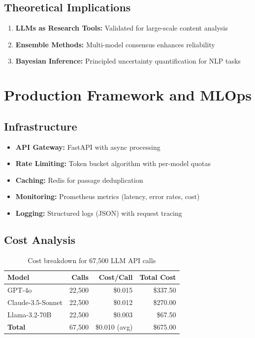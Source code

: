 \documentclass[11pt,a4paper]{article}
\begin{document}
\subsection{Theoretical Implications}

\begin{enumerate}
    \item \textbf{LLMs as Research Tools:} Validated for large-scale content analysis
    \item \textbf{Ensemble Methods:} Multi-model consensus enhances reliability
    \item \textbf{Bayesian Inference:} Principled uncertainty quantification for NLP tasks
\end{enumerate}

\section{Production Framework and MLOps}

\subsection{Infrastructure}

\begin{itemize}
    \item \textbf{API Gateway:} FastAPI with async processing
    \item \textbf{Rate Limiting:} Token bucket algorithm with per-model quotas
    \item \textbf{Caching:} Redis for passage deduplication
    \item \textbf{Monitoring:} Prometheus metrics (latency, error rates, cost)
    \item \textbf{Logging:} Structured logs (JSON) with request tracing
\end{itemize}

\subsection{Cost Analysis}

\begin{table}[H]
\centering
\caption{Cost breakdown for 67,500 LLM API calls}
\begin{tabular}{lrrr}
\toprule
\textbf{Model} & \textbf{Calls} & \textbf{Cost/Call} & \textbf{Total Cost} \\
\midrule
GPT-4o & 22,500 & \$0.015 & \$337.50 \\
Claude-3.5-Sonnet & 22,500 & \$0.012 & \$270.00 \\
Llama-3.2-70B & 22,500 & \$0.003 & \$67.50 \\
\midrule
\textbf{Total} & 67,500 & \$0.010 (avg) & \$675.00 \\
\bottomrule
\end{tabular}
\label{tab:cost-analysis}
\end{table}
\end{document}
